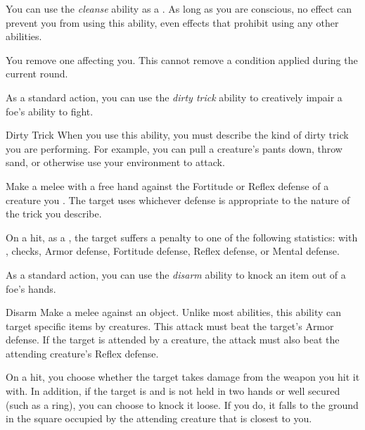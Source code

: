          You can use the \textit{cleanse} ability as a .
        As long as you are conscious, no effect can prevent you from using this ability, even effects that prohibit using any other abilities.
        \begin{apability}{}
            You remove one  affecting you.
            This cannot remove a condition applied during the current round.
        \end{apability}

         As a standard action, you can use the \textit{dirty trick} ability to creatively impair a foe's ability to fight.

        \begin{freeability}{Dirty Trick}\label{Dirty Trick}
            When you use this ability, you must describe the kind of dirty trick you are performing.
            For example, you can pull a creature's pants down, throw sand, or otherwise use your environment to attack.

            Make a melee  with a free hand against the Fortitude or Reflex defense of a creature you .
            The target uses whichever defense is appropriate to the nature of the trick you describe.

            On a hit, as a , the target suffers a  penalty to one of the following statistics:
                 with ,  checks, Armor defense, Fortitude defense, Reflex defense, or Mental defense.
        \end{freeability}

         As a standard action, you can use the \textit{disarm} ability to knock an item out of a foe's hands.

        \begin{freeability}{Disarm}\label{Disarm}
            Make a melee  against an object.
            Unlike most abilities, this ability can target specific items  by creatures.
            This attack must beat the target's Armor defense.
            If the target is attended by a creature, the attack must also beat the attending creature's Reflex defense.

            On a hit, you choose whether the target takes damage from the weapon you hit it with.
            In addition, if the target is  and is not held in two hands or well secured (such as a ring), you can choose to knock it loose.
            If you do, it falls to the ground in the square occupied by the attending creature that is closest to you.
        \end{freeability}

